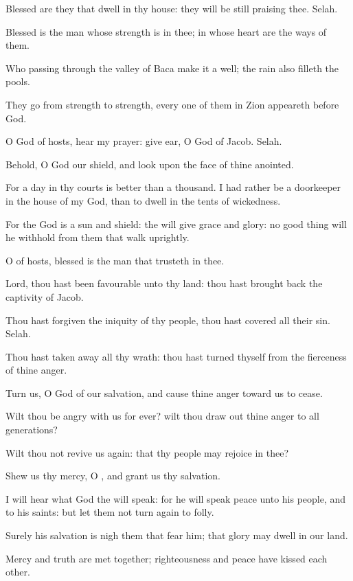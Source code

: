 \Verse Blessed are they that dwell in thy house: they will be still praising thee. Selah.

\Verse Blessed is the man whose strength is in thee; in whose heart are the ways of them.

\Verse Who passing through the valley of Baca make it a well; the rain also filleth the pools.

\Verse They go from strength to strength, every one of them in Zion appeareth before God.

\Verse O \LORD God of hosts, hear my prayer: give ear, O God of Jacob.  Selah.

\Verse Behold, O God our shield, and look upon the face of thine anointed.

\Verse For a day in thy courts is better than a thousand. I had rather be a doorkeeper in the house of my God, than to dwell in the tents of wickedness.

\Verse For the \LORD God is a sun and shield: the \LORD will give grace and glory: no good thing will he withhold from them that walk uprightly.

\Verse O \LORD of hosts, blessed is the man that trusteth in thee.




\Chapter
\Verse Lord, thou hast been favourable unto thy land: thou hast brought back the captivity of Jacob.

\Verse Thou hast forgiven the iniquity of thy people, thou hast covered all their sin. Selah.

\Verse Thou hast taken away all thy wrath: thou hast turned thyself from the fierceness of thine anger.

\Verse Turn us, O God of our salvation, and cause thine anger toward us to cease.

\Verse Wilt thou be angry with us for ever? wilt thou draw out thine anger to all generations?

\Verse Wilt thou not revive us again: that thy people may rejoice in thee?

\Verse Shew us thy mercy, O \LORD, and grant us thy salvation.

\Verse I will hear what God the \LORD will speak: for he will speak peace unto his people, and to his saints: but let them not turn again to folly.

\Verse Surely his salvation is nigh them that fear him; that glory may dwell in our land.

\Verse Mercy and truth are met together; righteousness and peace have kissed each other.

